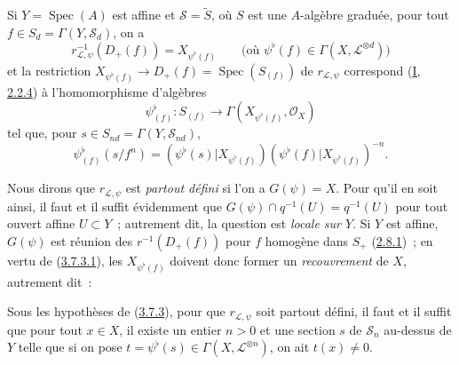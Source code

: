 \begin{proposition}[3.7.3]
\label{II.3.7.3-fr}
Si $Y=\operatorname{Spec}(A)$ est affine et $\mathcal{S}=\widetilde{S}$, où
$S$ est une $A$-algèbre graduée, pour tout
$f\in S_d=\Gamma(Y,\mathcal{S}_d)$, on a
\[
\label{II.3.7.3.1-fr}
  r_{\mathcal{L},\psi}^{-1}(D_+(f))=X_{\psi^\flat(f)}
  \qquad\bigl(\text{où }\psi^\flat(f)\in
  \Gamma(X,\mathcal{L}^{\otimes d})\bigr)
\tag{3.7.3.1}
\]
et la restriction $X_{\psi^\flat(f)}\to D_+(f)=\operatorname{Spec}(S_{(f)})$
de $r_{\mathcal{L},\psi}$ correspond
(\hyperref[I.2.2.4-fr]{I, 2.2.4}) à l'homomorphisme d'algèbres
\[
\label{II.3.7.3.2-fr}
  \psi_{(f)}^\flat:S_{(f)}\longrightarrow
  \Gamma(X_{\psi^\flat(f)},\mathcal{O}_X)
\tag{3.7.3.2}
\]
tel que, pour $s\in S_{nd}=\Gamma(Y,\mathcal{S}_{nd})$,
\[
\label{II.3.7.3.3-fr}
  \psi_{(f)}^\flat(s/f^n)
  =(\psi^\flat(s)|X_{\psi^\flat(f)})
   (\psi^\flat(f)|X_{\psi^\flat(f)})^{-n}.
\tag{3.7.3.3}
\]
\end{proposition}

Nous dirons que $r_{\mathcal{L},\psi}$ est \emph{partout défini} si l'on a
$G(\psi)=X$. Pour qu'il en soit ainsi, il faut et il suffit évidemment que
$G(\psi)\cap q^{-1}(U)=q^{-1}(U)$ pour tout ouvert affine $U\subset Y$~;
autrement dit, la question est \emph{locale sur $Y$}. Si $Y$ est affine,
$G(\psi)$ est réunion des $r^{-1}(D_+(f))$ pour $f$ homogène dans $S_+$
(\hyperref[II.2.8.1-fr]{2.8.1})~; en vertu de
(\hyperref[II.3.7.3.1-fr]{3.7.3.1}), les $X_{\psi^\flat(f)}$ doivent donc
former un \emph{recouvrement} de $X$, autrement dit~:

\begin{corollary}[3.7.4]
\label{II.3.7.4-fr}
Sous les hypothèses de (\hyperref[II.3.7.3-fr]{3.7.3}), pour que
$r_{\mathcal{L},\psi}$ soit partout défini, il faut et il suffit que pour tout
$x\in X$, il existe un entier $n>0$ et une section $s$ de $\mathcal{S}_n$
au-dessus de $Y$ telle que si on pose
$t=\psi^\flat(s)\in\Gamma(X,\mathcal{L}^{\otimes n})$, on ait $t(x)\neq0$.
\end{corollary}

